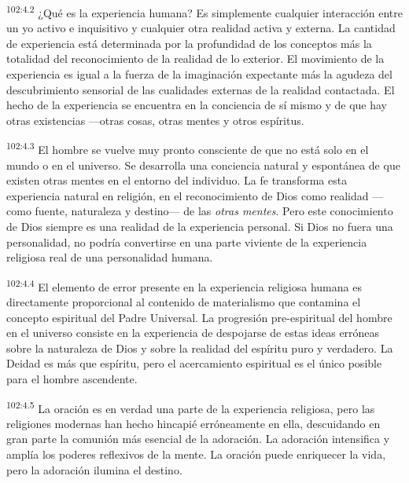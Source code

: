 \par
\textsuperscript{102:4.2} ¿Qué es la experiencia humana? Es simplemente cualquier interacción entre un yo activo e inquisitivo y cualquier otra realidad activa y externa. La cantidad de experiencia está determinada por la profundidad de los conceptos más la totalidad del reconocimiento de la realidad de lo exterior. El movimiento de la experiencia es igual a la fuerza de la imaginación expectante más la agudeza del descubrimiento sensorial de las cualidades externas de la realidad contactada. El hecho de la experiencia se encuentra en la conciencia de sí mismo y de que hay otras existencias ---otras cosas, otras mentes y otros espíritus.

\par
\textsuperscript{102:4.3} El hombre se vuelve muy pronto consciente de que no está solo en el mundo o en el universo. Se desarrolla una conciencia natural y espontánea de que existen otras mentes en el entorno del individuo. La fe transforma esta experiencia natural en religión, en el reconocimiento de Dios como realidad ---como fuente, naturaleza y destino--- de las \textit{otras mentes}. Pero este conocimiento de Dios siempre es una realidad de la experiencia personal. Si Dios no fuera una personalidad, no podría convertirse en una parte viviente de la experiencia religiosa real de una personalidad humana.

\par
\textsuperscript{102:4.4} El elemento de error presente en la experiencia religiosa humana es directamente proporcional al contenido de materialismo que contamina el concepto espiritual del Padre Universal. La progresión pre-espiritual del hombre en el universo consiste en la experiencia de despojarse de estas ideas erróneas sobre la naturaleza de Dios y sobre la realidad del espíritu puro y verdadero. La Deidad es más que espíritu, pero el acercamiento espiritual es el único posible para el hombre ascendente.

\par
\textsuperscript{102:4.5} La oración es en verdad una parte de la experiencia religiosa, pero las religiones modernas han hecho hincapié erróneamente en ella, descuidando en gran parte la comunión más esencial de la adoración. La adoración intensifica y amplía los poderes reflexivos de la mente. La oración puede enriquecer la vida, pero la adoración ilumina el destino.

